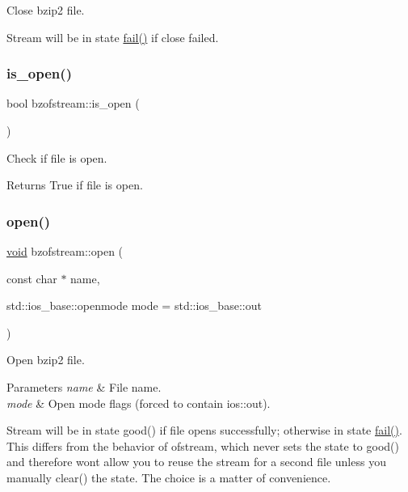 Close bzip2 file. 

Stream will be in state \hyperlink{_constraint_macros_8h_a73a3b169ac8c3419cbe15327e75ffcfd}{fail()} if close failed. \mbox{\label{classbzofstream_a9b827af5462beb0ffa2598b8b0bfbd98}} 
\subsubsection{\texorpdfstring{is\+\_\+open()}{is\_open()}}
{\footnotesize\ttfamily bool bzofstream\+::is\+\_\+open (\begin{DoxyParamCaption}{ }\end{DoxyParamCaption})\hspace{0.3cm}{\ttfamily [inline]}}



Check if file is open. 

\begin{DoxyReturn}{Returns}
True if file is open. 
\end{DoxyReturn}
\mbox{\label{classbzofstream_ad8b9cdf55e3dc4c1777a12ddc1528744}} 
\subsubsection{\texorpdfstring{open()}{open()}}
{\footnotesize\ttfamily \hyperlink{lp__lib_8h_ac7828c7b2b31d2e11af17bdb6289c5d9}{void} bzofstream\+::open (\begin{DoxyParamCaption}\item[{const char $\ast$}]{name,  }\item[{std\+::ios\+\_\+base\+::openmode}]{mode = {\ttfamily std\+:\+:ios\+\_\+base\+:\+:out} }\end{DoxyParamCaption})}



Open bzip2 file. 


\begin{DoxyParams}{Parameters}
{\em name} & File name. \\
\hline
{\em mode} & Open mode flags (forced to contain ios\+::out).\\
\hline
\end{DoxyParams}
Stream will be in state good() if file opens successfully; otherwise in state \hyperlink{_constraint_macros_8h_a73a3b169ac8c3419cbe15327e75ffcfd}{fail()}. This differs from the behavior of ofstream, which never sets the state to good() and therefore won\textquotesingle{}t allow you to reuse the stream for a second file unless you manually clear() the state. The choice is a matter of convenience. \mbox{\label{classbzofstream_a63d4075162fb823e204b0df0f25c06f0}} 
